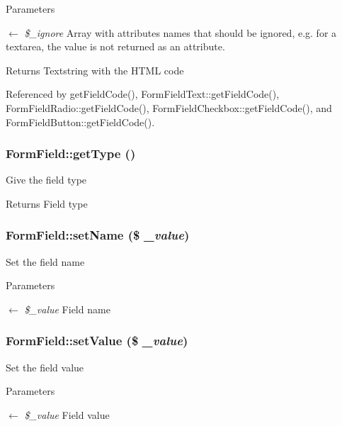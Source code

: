 \begin{DoxyParams}{Parameters}
\item[\mbox{$\leftarrow$} {\em \$\_\-ignore}]Array with attributes names that should be ignored, e.g. for a textarea, the value is not returned as an attribute. \end{DoxyParams}
\begin{DoxyReturn}{Returns}
Textstring with the HTML code 
\end{DoxyReturn}


Referenced by getFieldCode(), FormFieldText::getFieldCode(), FormFieldRadio::getFieldCode(), FormFieldCheckbox::getFieldCode(), and FormFieldButton::getFieldCode().

\subsubsection[{getType}]{\setlength{\rightskip}{0pt plus 5cm}FormField::getType ()}\label{classFormField_a1f64b737bccb6b2827f8c5665b9920c7}
Give the field type \begin{DoxyReturn}{Returns}
Field type 
\end{DoxyReturn}
\subsubsection[{setName}]{\setlength{\rightskip}{0pt plus 5cm}FormField::setName (\$ {\em \_\-value})}\label{classFormField_ad57e32bd53170af060e869b3b60f0ef7}
Set the field name 
\begin{DoxyParams}{Parameters}
\item[\mbox{$\leftarrow$} {\em \$\_\-value}]Field name \end{DoxyParams}
\subsubsection[{setValue}]{\setlength{\rightskip}{0pt plus 5cm}FormField::setValue (\$ {\em \_\-value})}\label{classFormField_a465ff61e290d82be96bb793c3a14b3e7}
Set the field value 
\begin{DoxyParams}{Parameters}
\item[\mbox{$\leftarrow$} {\em \$\_\-value}]Field value \end{DoxyParams}


